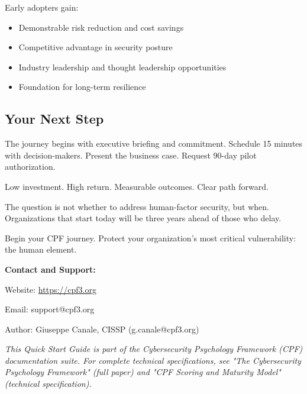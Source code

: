 \documentclass[11pt,a4paper]{article}
\begin{document}
Early adopters gain:
\begin{itemize}
\item Demonstrable risk reduction and cost savings
\item Competitive advantage in security posture
\item Industry leadership and thought leadership opportunities
\item Foundation for long-term resilience
\end{itemize}

\subsection{Your Next Step}

The journey begins with executive briefing and commitment. Schedule 15 minutes with decision-makers. Present the business case. Request 90-day pilot authorization.

Low investment. High return. Measurable outcomes. Clear path forward.

The question is not whether to address human-factor security, but when. Organizations that start today will be three years ahead of those who delay.

Begin your CPF journey. Protect your organization's most critical vulnerability: the human element.

\vspace{1cm}

\textbf{Contact and Support:}

Website: \url{https://cpf3.org}

Email: support@cpf3.org

Author: Giuseppe Canale, CISSP (g.canale@cpf3.org)

\vspace{0.5cm}

\textit{This Quick Start Guide is part of the Cybersecurity Psychology Framework (CPF) documentation suite. For complete technical specifications, see "The Cybersecurity Psychology Framework" (full paper) and "CPF Scoring and Maturity Model" (technical specification).}
\end{document}

